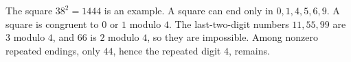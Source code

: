 The square $38^2=\boxed{1444}$ is an example. A square can end only in $0,1,4,5,6,9$. A square is congruent to $0$ or $1$ modulo $4$. The last-two-digit numbers $11,55,99$ are $3$ modulo $4$, and $66$ is $2$ modulo $4$, so they are impossible. Among nonzero repeated endings, only $44$, hence the repeated digit $\boxed4$, remains.
